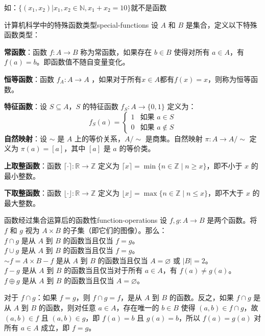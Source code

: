 如：$\{(x_1,x_2)|x_1,x_2\in\mathbb{N},x_1+x_2=10\}$就不是函数
\begin{definition}{计算机科学中的特殊函数类型}{special-functions}
设 $A$ 和 $B$ 是集合，定义以下特殊函数类型：

\textbf{常函数}：函数 $f: A \to B$ 称为常函数，如果存在 $b \in B$ 使得对所有 $a \in A$，有 $f(a) = b$。即函数值不随自变量变化。

\textbf{恒等函数}：函数 $f_A: A \to A$ ，如果对于所有$x\in A$都有$f(x)=x$，则称为恒等函数。

\textbf{特征函数}：设 $S \subseteq A$，$S$ 的特征函数 $f_S: A \to \{0,1\}$ 定义为：
\[
f_S(a) = 
\begin{cases}
1 & \text{如果 } a \in S \\
0 & \text{如果 } a \notin S
\end{cases}
\]
\textbf{自然映射}：设 $\sim$ 是 $A$ 上的等价关系，$A/\sim$ 是商集。自然映射 $\pi: A \to A/\sim$ 定义为 $\pi(a) = [a]$，其中 $[a]$ 是 $a$ 的等价类。

\textbf{上取整函数}：函数 $\lceil \cdot \rceil: \mathbb{R} \to \mathbb{Z}$ 定义为 $\lceil x \rceil = \min\{n \in \mathbb{Z} \mid n \geqslant x\}$，即不小于 $x$ 的最小整数。

\textbf{下取整函数}：函数 $\lfloor \cdot \rfloor: \mathbb{R} \to \mathbb{Z}$ 定义为 $\lfloor x \rfloor = \max\{n \in \mathbb{Z} \mid n \leqslant x\}$，即不大于 $x$ 的最大整数。
\end{definition}
\begin{theorem}{函数经过集合运算后的函数性}{function-operations}
设 $f, g: A \to B$ 是两个函数。将 $f$ 和 $g$ 视为 $A \times B$ 的子集（即它们的图像）。那么：\\
$f \cap g$ 是从 $A$ 到 $B$ 的函数当且仅当 $f = g$。\\
$f \cup g$ 是从 $A$ 到 $B$ 的函数当且仅当 $f = g$。\\
$\sim f = A \times B - f$ 是从 $A$ 到 $B$ 的函数当且仅当 $A = \varnothing$ 或 $|B|=2$。\\
$f - g$ 是从 $A$ 到 $B$ 的函数当且仅当对于所有 $a \in A$，有 $f(a) \neq g(a)$。\\
$f \oplus g$ 是从 $A$ 到 $B$ 的函数当且仅当 $A = \varnothing$。
\end{theorem}

对于 $f \cap g$：如果 $f = g$，则 $f \cap g = f$，是从 $A$ 到 $B$ 的函数。反之，如果 $f \cap g$ 是从 $A$ 到 $B$ 的函数，则对任意 $a \in A$，存在唯一的 $b \in B$ 使得 $(a, b) \in f \cap g$，故 $(a, b) \in f$ 且 $(a, b) \in g$，即 $f(a) = b$ 且 $g(a) = b$，所以 $f(a) = g(a)$ 对所有 $a \in A$ 成立，即 $f = g$。

